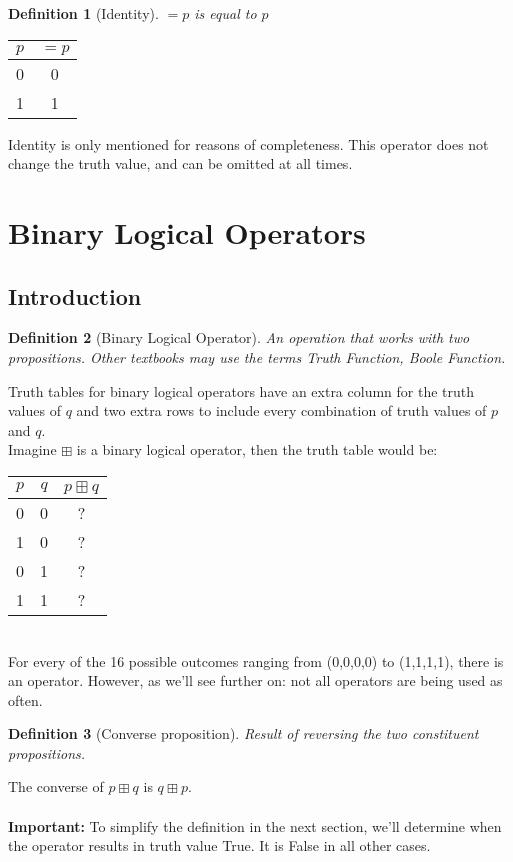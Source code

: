 \documentclass[10pt,a4paper,draft,titlepage,onecolumn]{book}
\newtheorem{definition}{Definition}[subsection]
\begin{document}
\begin{definition}[Identity]
$=p$ is equal to $p$
\end{definition}

\begin{center}
\begin{tabular}{ |c|c| }
 \hline
 $p$ & $=p$  \\
 \hline
 0 &0 \\
 1 & 1\\
 \hline
\end{tabular} 
\end{center} 
Identity is only mentioned for reasons of completeness. This operator does not change the truth value, and can be omitted at all times.

\section{Binary Logical Operators}
\subsection*{Introduction}
\begin{definition}[Binary Logical Operator]
An operation that works with two propositions. Other textbooks may use the terms \textit{Truth Function}, \textit{Boole Function}.
\end{definition}
Truth tables for binary logical operators have an extra column for the truth values of $q$ and two extra rows to include every combination of truth values of $p$ and $q$. \\
Imagine $\boxplus$ is a binary logical operator, then the truth table would be:\\
\begin{tabular}{ |c|c|c| }
 \hline
 $p$ & $q$ & $p \boxplus q$ \\
 \hline 
 0 & 0 & ? \\
 1 & 0 & ? \\
 0 & 1 & ? \\
 1 & 1 & ? \\
 \hline
\end{tabular} \\
For every of the 16 possible outcomes ranging from (0,0,0,0) to  (1,1,1,1), there is an operator. However, as we'll see further on: not all operators are being used as often.
\begin{definition}[Converse proposition] Result of reversing the two constituent propositions.
\end{definition}
The converse of  $p{\boxplus}q$  is  $q{\boxplus}p$. \\ \\ 
\textbf{Important:} To simplify the definition in the next section, we'll determine when the operator results in truth value True. It is False in all other cases.
\end{document}
